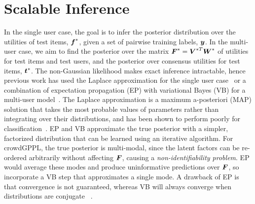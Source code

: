 \section{Scalable Inference}\label{sec:inf}

In the single user case, the goal is to infer the posterior distribution over the utilities of test items, $\boldsymbol f^*$, 
given a set of pairwise training labels, $\boldsymbol y$. In the multi-user case, we aim to find the posterior over the matrix
$\boldsymbol F^*=\boldsymbol V^{*T} \boldsymbol W^*$ of utilities for test items and test users,
and the posterior over consensus utilities for test items, $\boldsymbol t^*$.
The non-Gaussian likelihood makes exact inference intractable, hence previous work has used
 the Laplace approximation for the single user case~\citep{chu2005preference}
or a combination of expectation propagation (EP) with variational Bayes (VB) for a 
multi-user model~\citep{houlsby2012collaborative}.
The Laplace approximation is a maximum a-posteriori (MAP) solution that
takes the most probable values of parameters rather than integrating over their distributions,
and has been shown to perform poorly for classification~\citep{nickisch2008approximations}. 
EP and VB approximate the true posterior with a simpler, factorized distribution
that can be learned using an iterative algorithm.
For crowdGPPL, the true posterior is multi-modal, since the latent factors can be re-ordered arbitrarily without
affecting $\boldsymbol F$, causing a \emph{non-identifiability problem}.
EP would average these modes and produce uninformative predictions over $\boldsymbol F$, so
\citet{houlsby2012collaborative} incorporate a VB step that approximates a single mode.
A drawback of EP is that convergence is not guaranteed,
whereas VB will always converge when distributions are conjugate 
~\citep{minka2001expectation}.

